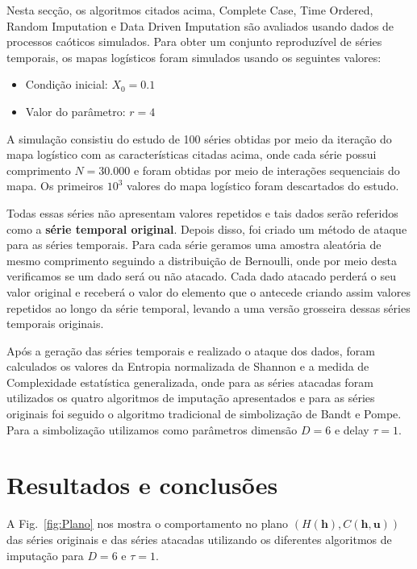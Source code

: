 \documentclass[paper=a4, fontsize=11pt]{scrartcl}
\numberwithin{equation}{section}
\numberwithin{figure}{section}
\numberwithin{table}{section}
\begin{document}
Nesta secção, os algoritmos citados acima, Complete Case, Time Ordered, Random Imputation e Data Driven Imputation são avaliados usando dados de processos caóticos simulados. Para obter um conjunto reproduzível de séries temporais, os mapas logísticos foram simulados usando os seguintes valores:

\begin{itemize}
    \item Condição inicial: $X_{0} = 0.1$
    \item Valor do parâmetro: $r = 4$
\end{itemize}

A simulação consistiu do estudo de 100 séries obtidas por meio da iteração do mapa logístico com as características citadas acima, onde cada série possui comprimento $N = 30.000$ e foram obtidas por meio de interações sequenciais do mapa. Os primeiros $10^3$ valores do mapa logístico foram descartados do estudo.

Todas essas séries não apresentam valores repetidos e tais dados serão referidos como a \textbf{série temporal original}. Depois disso, foi criado um método de ataque para as séries temporais. Para cada série geramos uma amostra aleatória de mesmo comprimento seguindo a distribuição de Bernoulli, onde por meio desta verificamos se um dado será ou não atacado. Cada dado atacado perderá o seu valor original e receberá o valor do elemento que o antecede criando assim valores repetidos ao longo da série temporal, levando a uma versão grosseira dessas séries temporais originais.

Após a geração das séries temporais e realizado o ataque dos dados, foram calculados os valores da Entropia normalizada de Shannon e a medida de Complexidade estatística generalizada, onde para as séries atacadas foram utilizados os quatro algoritmos de imputação apresentados e para as séries originais foi seguido o algoritmo tradicional de simbolização de Bandt e Pompe.  Para a simbolização utilizamos como parâmetros dimensão $D = 6$ e delay $\tau = 1$.

\section{Resultados e conclusões}

A Fig.~\ref{fig:Plano} nos mostra o comportamento no plano $(H(\bm h), C(\bm h, \bm u))$ das séries originais e das séries atacadas utilizando os diferentes algoritmos de imputação para $D = 6$ e $\tau = 1$.
\end{document}
